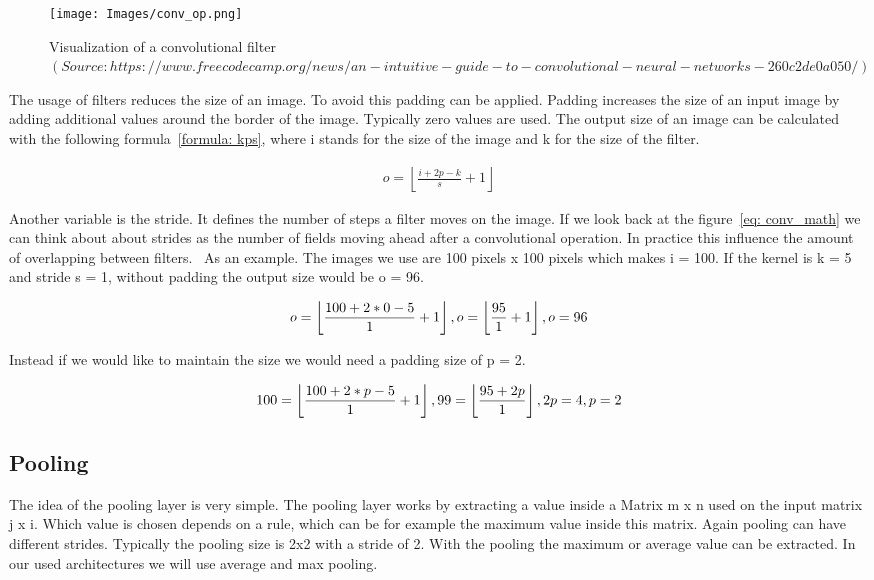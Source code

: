 \documentclass[11pt, a4paper]{article}
\begin{document}
\begin{figure}[htp]
\centering
\texttt{[image: Images/conv\_op.png]} 
\caption{Visualization of a convolutional filter $(Source: https://www.freecodecamp.org/news/an-intuitive-guide-to-convolutional-neural-networks-260c2de0a050/)$}
\label{fig: conv_op}
\end{figure}

The usage of filters reduces the size of an image. To avoid this padding can be applied. Padding increases the size of an input image by adding additional values around the border of the image. Typically zero values are used.\cite{CNNmath}
The output size of an image can be calculated with the following formula~\ref{formula: kps}, where i stands for the size of the image and k for the size of the filter.

\begin{center}
\begin{eqnarray}
o = \left \lfloor \frac{i + 2p - k}{s}  + 1\right \rfloor
\end{eqnarray}
\label{formula: kps}
\end{center}

Another variable is the stride. It defines the number of steps a filter moves on the image. If we look back at the figure~\ref{eq: conv_math} we can think about about strides as the number of fields moving ahead after a convolutional operation. In practice this influence the amount of overlapping between filters.~\cite[p.~7]{conv_paper}
As an example. The images we use are 100 pixels x 100 pixels which makes i = 100. If the kernel is k = 5 and stride s = 1, without padding the output size would be o = 96.

\begin{center}
\[o = \left \lfloor \frac{100 + 2 * 0 - 5}{1}  + 1\right \rfloor, \newline
 o = \left \lfloor \frac{95}{1}  + 1\right \rfloor, \newline
 o = 96\]
\end{center}
Instead if we would like to maintain the size we would need a padding size of p = 2.
\begin{center}
\[100 = \left \lfloor \frac{100 + 2 * p - 5}{1}  + 1\right \rfloor, \newline
 99 = \left \lfloor \frac{95 + 2p}{1}\right \rfloor, \newline
 2p = 4, \newline
 p = 2\]
\end{center}

\subsection{Pooling}
The idea of the pooling layer is very simple. The pooling layer works by extracting a value inside a Matrix m x n used on the input matrix j x i. Which value is chosen depends on a rule, which can be for example the maximum value inside this matrix. Again pooling can have different strides. Typically the pooling size is 2x2 with a stride of 2. With the pooling the maximum or average value can be extracted.\cite[p.~326 - 327]{nndl} In our used architectures we will use average and max pooling.
\end{document}
